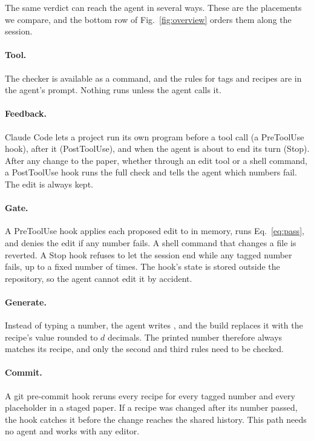 The same verdict can reach the agent in several ways. These are the placements we compare, and the bottom row of
Fig.~\ref{fig:overview} orders them along the session.

\paragraph{Tool.} The checker is available as a command, and the rules for tags and recipes are in the agent's
prompt. Nothing runs unless the agent calls it.

\paragraph{Feedback.} Claude Code lets a project run its own program before a tool call (a PreToolUse hook), after
it (PostToolUse), and when the agent is about to end its turn (Stop). After any change to the paper, whether
through an edit tool or a shell command, a PostToolUse hook runs the full check and tells the agent which numbers fail. The edit is always kept.

\paragraph{Gate.} A PreToolUse hook applies each proposed edit to  in memory, runs
Eq.~\eqref{eq:pass}, and denies the edit if any number fails. A shell command that changes a  file is
reverted. A Stop hook refuses to let the session end while any tagged number fails, up to a fixed number of times.
The hook's state is stored outside the repository, so the agent cannot edit it by accident.

\paragraph{Generate.} Instead of typing a number, the agent writes \valmacro{}, and the build replaces it with the
recipe's value rounded to $d$ decimals. The printed number therefore always matches its recipe, and only the second
and third rules need to be checked.

\paragraph{Commit.} A git pre-commit hook reruns every recipe for every tagged number and every placeholder in a
staged paper. If a recipe was changed after its number passed, the hook catches it before the change reaches the
shared history. This path needs no agent and works with any editor.
